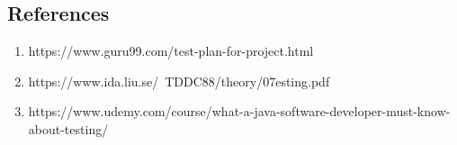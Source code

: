 \subsection{References}
\begin{enumerate}
  \item https://www.guru99.com/test-plan-for-project.html
  \item https://www.ida.liu.se/~TDDC88/theory/07esting.pdf
  \item https://www.udemy.com/course/what-a-java-software-developer-must-know-about-testing/
\end{enumerate}

